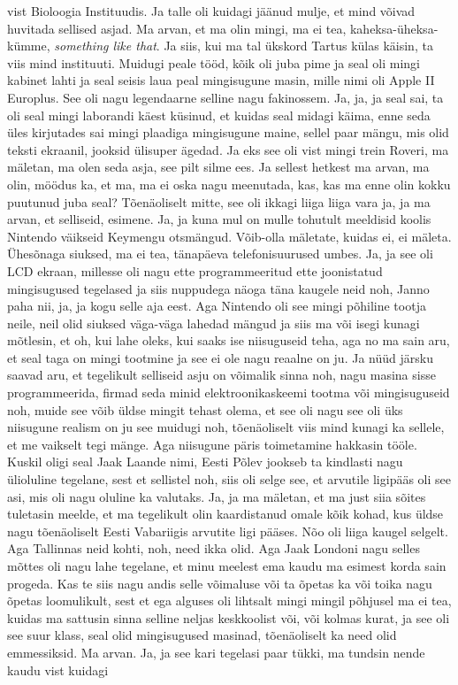 vist Bioloogia Instituudis. Ja  talle oli kuidagi jäänud mulje, et mind võivad huvitada sellised asjad. Ma arvan, et ma olin mingi, ma ei tea, kaheksa-üheksa-kümme, \emph{something like that}. Ja siis, kui ma tal ükskord Tartus külas käisin, ta viis mind instituuti. Muidugi peale tööd, kõik oli juba pime ja  seal oli mingi kabinet lahti ja seal seisis laua peal mingisugune masin, mille nimi oli Apple II Europlus. See oli nagu legendaarne selline nagu fakinossem. Ja, ja, ja seal sai, ta oli seal mingi laborandi käest küsinud, et kuidas seal midagi käima, enne seda üles kirjutades sai mingi plaadiga mingisugune maine, sellel paar mängu, mis olid teksti ekraanil, jooksid ülisuper ägedad. Ja eks see oli vist mingi trein Roveri, ma mäletan, ma olen seda asja, see pilt silme ees. Ja sellest hetkest ma arvan, ma olin, möödus ka, et ma, ma ei oska nagu meenutada, kas, kas ma enne olin kokku puutunud juba seal? Tõenäoliselt mitte, see oli ikkagi liiga liiga vara ja, ja ma arvan, et selliseid, esimene. Ja, ja kuna mul on mulle tohutult meeldisid koolis Nintendo väikseid Keymengu otsmängud. Võib-olla mäletate, kuidas ei, ei mäleta. Ühesõnaga siuksed, ma ei tea, tänapäeva telefonisuurused umbes. Ja, ja see oli LCD ekraan, millesse oli nagu ette programmeeritud ette joonistatud mingisugused tegelased ja siis nuppudega näoga täna kaugele neid noh, Janno paha nii, ja, ja kogu selle aja eest. Aga Nintendo oli see mingi põhiline tootja neile, neil olid siuksed väga-väga lahedad mängud ja siis ma või isegi kunagi mõtlesin, et oh, kui lahe oleks, kui saaks ise niisuguseid teha, aga no ma sain aru, et seal taga on mingi tootmine ja see ei ole nagu reaalne on ju. Ja nüüd järsku saavad aru, et tegelikult selliseid asju on võimalik sinna noh, nagu masina sisse programmeerida, firmad seda minid elektroonikaskeemi tootma või mingisuguseid noh, muide see võib üldse mingit tehast olema, et see oli nagu see oli üks niisugune realism on ju see muidugi noh, tõenäoliselt viis mind kunagi ka sellele, et me vaikselt tegi mänge. Aga niisugune päris toimetamine hakkasin tööle. Kuskil oligi seal Jaak Laande nimi, Eesti Põlev jookseb ta kindlasti nagu ülioluline tegelane, sest et sellistel noh, siis oli selge see, et arvutile ligipääs oli see asi, mis oli nagu oluline ka valutaks. Ja, ja ma mäletan, et ma just siia sõites tuletasin meelde, et ma tegelikult olin kaardistanud omale kõik kohad, kus üldse nagu tõenäoliselt Eesti Vabariigis arvutite ligi pääses. Nõo oli liiga kaugel selgelt. Aga Tallinnas neid kohti, noh, need ikka olid. Aga Jaak Londoni nagu selles mõttes oli nagu lahe tegelane, et minu meelest ema kaudu ma esimest korda sain progeda. Kas te siis nagu andis selle võimaluse või ta õpetas ka või toika nagu õpetas loomulikult, sest et ega alguses oli lihtsalt mingi mingil põhjusel ma ei tea, kuidas ma sattusin sinna selline neljas keskkoolist või, või kolmas kurat, ja see oli see suur klass, seal olid mingisugused masinad, tõenäoliselt ka need olid emmessiksid. Ma arvan. Ja, ja see kari tegelasi paar tükki, ma tundsin nende kaudu vist kuidagi 